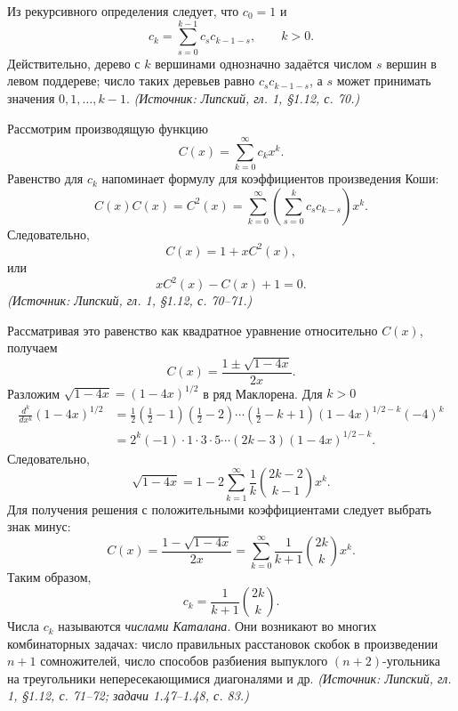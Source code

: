 \documentclass[a4paper,12pt]{article}
\begin{document}
Из рекурсивного определения следует, что \(c_0=1\) и
\[
c_k=\sum_{s=0}^{k-1}c_sc_{k-1-s},\qquad k>0.
\]
Действительно, дерево с \(k\) вершинами однозначно задаётся числом \(s\) вершин в левом поддереве; число таких деревьев равно \(c_sc_{k-1-s}\), а \(s\) может принимать значения \(0,1,\dots,k-1\).
\textit{(Источник: Липский, гл. 1, §1.12, с. 70.)}

Рассмотрим производящую функцию
\[
C(x)=\sum_{k=0}^{\infty}c_kx^k.
\]
Равенство для \(c_k\) напоминает формулу для коэффициентов произведения Коши:
\[
C(x)C(x)=C^2(x)=\sum_{k=0}^{\infty}\left(\sum_{s=0}^{k}c_sc_{k-s}\right)x^k.
\]
Следовательно,
\[
C(x)=1+xC^2(x),
\]
или
\[
xC^2(x)-C(x)+1=0.
\]
\textit{(Источник: Липский, гл. 1, §1.12, с. 70--71.)}

Рассматривая это равенство как квадратное уравнение относительно \(C(x)\), получаем
\[
C(x)=\frac{1\pm\sqrt{1-4x}}{2x}.
\]
Разложим \(\sqrt{1-4x}=(1-4x)^{1/2}\) в ряд Маклорена. Для \(k>0\)
\[
\begin{aligned}
\frac{d^k}{dx^k}(1-4x)^{1/2}
&=\frac12\left(\frac12-1\right)\left(\frac12-2\right)\cdots\left(\frac12-k+1\right)(1-4x)^{1/2-k}(-4)^k\\
&=2^k(-1)\cdot1\cdot3\cdot5\cdots(2k-3)(1-4x)^{1/2-k}.
\end{aligned}
\]
Следовательно,
\[
\sqrt{1-4x}=1-2\sum_{k=1}^{\infty}\frac{1}{k}\binom{2k-2}{k-1}x^k.
\]
Для получения решения с положительными коэффициентами следует выбрать знак минус:
\[
C(x)=\frac{1-\sqrt{1-4x}}{2x}
=\sum_{k=0}^{\infty}\frac{1}{k+1}\binom{2k}{k}x^k.
\]
Таким образом,
\[
c_k=\frac{1}{k+1}\binom{2k}{k}.
\]
Числа \(c_k\) называются \emph{числами Каталана}. Они возникают во многих комбинаторных задачах: число правильных расстановок скобок в произведении \(n+1\) сомножителей, число способов разбиения выпуклого \((n+2)\)-угольника на треугольники непересекающимися диагоналями и др.
\textit{(Источник: Липский, гл. 1, §1.12, с. 71--72; задачи 1.47--1.48, с. 83.)}
\end{document}
